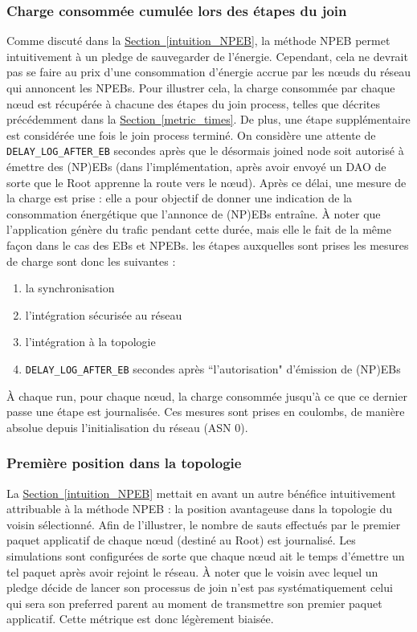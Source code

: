 \documentclass[]{report}
\newcommand{\wordlink}[2]{\hyperref[#2]{#1~\ref{#2}}}
\begin{document}
\subsubsection{Charge consommée cumulée lors des étapes du join}
\label{metric_charges}

Comme discuté dans la \wordlink{Section}{intuition_NPEB}, la méthode NPEB permet intuitivement à un pledge de sauvegarder de l'énergie. Cependant, cela ne devrait pas se faire au prix d'une consommation d'énergie accrue par les nœuds du réseau qui annoncent les NPEBs. Pour illustrer cela, la charge consommée par chaque nœud est récupérée à chacune des étapes du join process, telles que décrites précédemment dans la \wordlink{Section}{metric_times}. De plus, une étape supplémentaire est considérée une fois le join process terminé. On considère une attente de \texttt{DELAY\_LOG\_AFTER\_EB} secondes après que le désormais joined node soit autorisé à émettre des (NP)EBs (dans l'implémentation, après avoir envoyé un DAO de sorte que le Root apprenne la route vers le nœud). Après ce délai, une mesure de la charge est prise : elle a pour objectif de donner une indication de la consommation énergétique que l'annonce de (NP)EBs entraîne. À noter que l'application génère du trafic pendant cette durée, mais elle le fait de la même façon dans le cas des EBs et NPEBs. les étapes auxquelles sont prises les mesures de charge sont donc les suivantes :

\begin{enumerate}
\item la synchronisation
\item l'intégration sécurisée au réseau
\item l'intégration à la topologie 
\item \texttt{DELAY\_LOG\_AFTER\_EB} secondes après ``l'autorisation" d'émission de (NP)EBs
\end{enumerate}
\vspace{0.2cm}
À chaque run, pour chaque nœud, la charge consommée jusqu'à ce que ce dernier passe une étape est journalisée. Ces mesures sont prises en coulombs, de manière absolue depuis l'initialisation du réseau (ASN 0).

\subsubsection{Première position dans la topologie}
\label{metric_hops}

La \wordlink{Section}{intuition_NPEB} mettait en avant un autre bénéfice intuitivement attribuable à la méthode NPEB : la position avantageuse dans la topologie du voisin sélectionné. Afin de l'illustrer, le nombre de sauts effectués par le premier paquet applicatif de chaque nœud (destiné au Root) est journalisé. Les simulations sont configurées de sorte que chaque nœud ait le temps d'émettre un tel paquet après avoir rejoint le réseau. À noter que le voisin avec lequel un pledge décide de lancer son processus de join n'est pas systématiquement celui qui sera son preferred parent au moment de transmettre son premier paquet applicatif. Cette métrique est donc légèrement biaisée.
\end{document}
